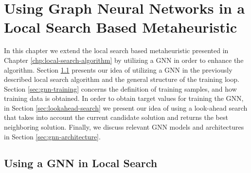 \documentclass[draft,final]{vutinfth} %
\begin{document}
\chapter{Using Graph Neural Networks in a Local Search Based Metaheuristic}\label{chp:gnn}

In this chapter we extend the local search based metaheuristic presented in Chapter \ref{chp:local-search-algorithm} by utilizing a GNN in order to enhance the algorithm. 
Section \ref{sec:gnn-local-search} presents our idea of utilizing a GNN in the previously described local search algorithm and the general structure of the training loop. 
Section \ref{sec:gnn-training} concerns the definition of training samples, and how training data is obtained. 
In order to obtain target values for training the GNN, in Section \ref{sec:lookahead-search} we present our idea of using a look-ahead search that takes into account the current candidate solution and returns the best neighboring solution. 
Finally, we discuss relevant GNN models and architectures in Section \ref{sec:gnn-architecture}.


\section{Using a GNN in Local Search}\label{sec:gnn-local-search}
\end{document}
